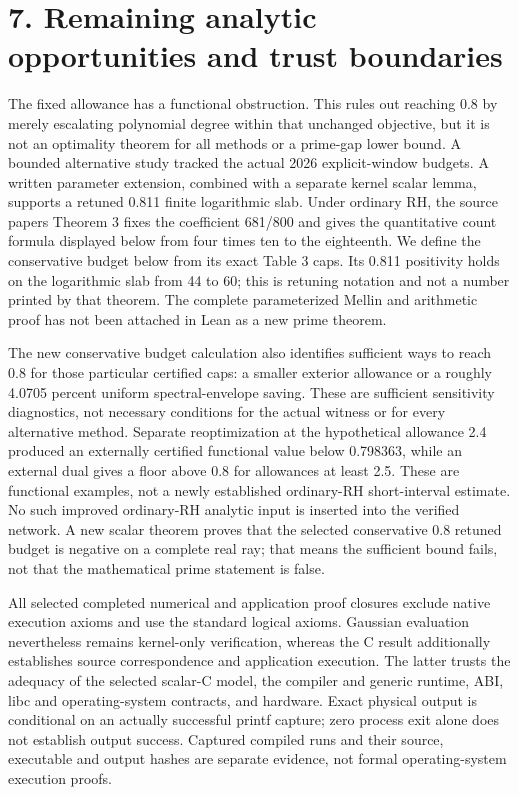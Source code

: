 \documentclass[11pt]{article}
\begin{document}
\section{7. Remaining analytic opportunities and trust boundaries}

The fixed allowance has a functional obstruction. This rules out reaching 0.8 by merely escalating polynomial degree within that unchanged objective, but it is not an optimality theorem for all methods or a prime-gap lower bound. A bounded alternative study tracked the actual 2026 explicit-window budgets. A written parameter extension, combined with a separate kernel scalar lemma, supports a retuned 0.811 finite logarithmic slab. Under ordinary RH, the source papers Theorem 3 fixes the coefficient 681/800 and gives the quantitative count formula displayed below from four times ten to the eighteenth. We define the conservative budget below from its exact Table 3 caps. Its 0.811 positivity holds on the logarithmic slab from 44 to 60; this is retuning notation and not a number printed by that theorem. The complete parameterized Mellin and arithmetic proof has not been attached in Lean as a new prime theorem.


The new conservative budget calculation also identifies sufficient ways to reach 0.8 for those particular certified caps: a smaller exterior allowance or a roughly 4.0705 percent uniform spectral-envelope saving. These are sufficient sensitivity diagnostics, not necessary conditions for the actual witness or for every alternative method. Separate reoptimization at the hypothetical allowance 2.4 produced an externally certified functional value below 0.798363, while an external dual gives a floor above 0.8 for allowances at least 2.5. These are functional examples, not a newly established ordinary-RH short-interval estimate. No such improved ordinary-RH analytic input is inserted into the verified network. A new scalar theorem proves that the selected conservative 0.8 retuned budget is negative on a complete real ray; that means the sufficient bound fails, not that the mathematical prime statement is false.


All selected completed numerical and application proof closures exclude native execution axioms and use the standard logical axioms. Gaussian evaluation nevertheless remains kernel-only verification, whereas the C result additionally establishes source correspondence and application execution. The latter trusts the adequacy of the selected scalar-C model, the compiler and generic runtime, ABI, libc and operating-system contracts, and hardware. Exact physical output is conditional on an actually successful printf capture; zero process exit alone does not establish output success. Captured compiled runs and their source, executable and output hashes are separate evidence, not formal operating-system execution proofs.
\end{document}
